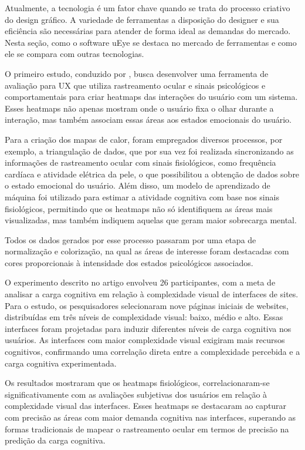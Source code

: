 Atualmente, a tecnologia é um fator chave quando se trata do processo criativo do design gráfico. A variedade de ferramentas a disposição do designer e sua eficiência são necessárias para atender de forma ideal as demandas do mercado. Nesta seção, como o software uEye se destaca no mercado de ferramentas e como ele se compara com outras tecnologias.


O primeiro estudo, conduzido por \textcite{GEORGES2016}, busca desenvolver uma ferramenta de avaliação para UX que utiliza rastreamento ocular e sinais psicológicos e comportamentais para criar heatmaps das interações do usuário com um sistema. Esses heatmaps não apenas mostram onde o usuário fixa o olhar durante a interação, mas também associam essas áreas aos estados emocionais do usuário.

Para a criação dos mapas de calor, foram empregados diversos processos, por exemplo, a triangulação de dados, que por sua vez foi realizada sincronizando as informações de rastreamento ocular com sinais fisiológicos, como frequência cardíaca e atividade elétrica da pele, o que possibilitou a obtenção de dados sobre o estado emocional do usuário. Além disso, um modelo de aprendizado de máquina foi utilizado para estimar a atividade cognitiva com base nos sinais fisiológicos, permitindo que os heatmaps não só identifiquem as áreas mais visualizadas, mas também indiquem aquelas que geram maior sobrecarga mental. 

Todos os dados gerados por esse processo passaram por uma etapa de normalização e colorização, na qual as áreas de interesse foram destacadas com cores proporcionais à intensidade dos estados psicológicos associados.

O experimento descrito no artigo envolveu 26 participantes, com a meta de analisar a carga cognitiva em relação à complexidade visual de interfaces de sites. Para o estudo, os pesquisadores selecionaram nove páginas iniciais de websites, distribuídas em três níveis de complexidade visual: baixo, médio e alto. Essas interfaces foram projetadas para induzir diferentes níveis de carga cognitiva nos usuários. As interfaces com maior complexidade visual exigiram mais recursos cognitivos, confirmando uma correlação direta entre a complexidade percebida e a carga cognitiva experimentada.

Os resultados mostraram que os heatmaps fisiológicos, correlacionaram-se significativamente com as avaliações subjetivas dos usuários em relação à complexidade visual das interfaces. Esses heatmaps se destacaram ao capturar com precisão as áreas com maior demanda cognitiva nas interfaces, superando as formas tradicionais de mapear o rastreamento ocular em termos de precisão na predição da carga cognitiva.

